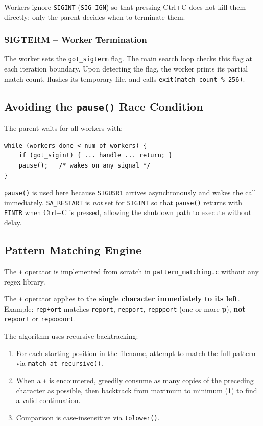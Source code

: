 \documentclass[12pt,a4paper]{article}
\begin{document}
Workers ignore \texttt{SIGINT} (\texttt{SIG\_IGN}) so that pressing Ctrl+C
does not kill them directly; only the parent decides when to terminate them.

\subsubsection{SIGTERM -- Worker Termination}

The worker sets the \texttt{got\_sigterm} flag. The main search loop checks
this flag at each iteration boundary. Upon detecting the flag, the worker
prints its partial match count, flushes its temporary file, and calls
\texttt{exit(match\_count \% 256)}.

\subsection{Avoiding the \texttt{pause()} Race Condition}

The parent waits for all workers with:

\begin{lstlisting}[caption={Wait loop in worker.c}]
while (workers_done < num_of_workers) {
    if (got_sigint) { ... handle ... return; }
    pause();   /* wakes on any signal */
}
\end{lstlisting}

\texttt{pause()} is used here because \texttt{SIGUSR1} arrives asynchronously
and wakes the call immediately. \texttt{SA\_RESTART} is \textit{not} set for
\texttt{SIGINT} so that \texttt{pause()} returns with \texttt{EINTR} when
Ctrl+C is pressed, allowing the shutdown path to execute without delay.

\subsection{Pattern Matching Engine}

The \texttt{+} operator is implemented from scratch in
\texttt{pattern\_matching.c} without any regex library.

\begin{infobox}
The \texttt{+} operator applies to the \textbf{single character immediately to
its left}. Example: \texttt{rep+ort} matches \texttt{report},
\texttt{repport}, \texttt{reppport} (one or more \textbf{p}), \textbf{not}
\texttt{repoort} or \texttt{repoooort}.
\end{infobox}

The algorithm uses recursive backtracking:
\begin{enumerate}
    \item For each starting position in the filename, attempt to match the
          full pattern via \texttt{match\_at\_recursive()}.
    \item When a \texttt{+} is encountered, greedily consume as many copies of
          the preceding character as possible, then backtrack from maximum to
          minimum (1) to find a valid continuation.
    \item Comparison is case-insensitive via \texttt{tolower()}.
\end{enumerate}
\end{document}

